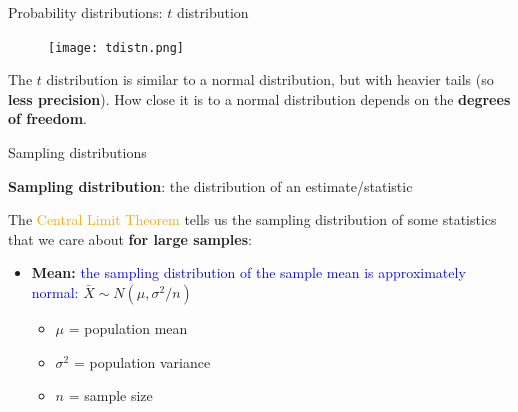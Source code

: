 \documentclass[10pt,t]{beamer}
\begin{document}
\begin{frame}{Probability distributions: $t$ distribution}
\begin{figure}
	\centering \texttt{[image: tdistn.png]}
\end{figure}

The $t$ distribution is similar to a normal distribution, but with heavier tails (so \textbf{less precision}). How close it is to a normal distribution depends on the \textbf{degrees of freedom}.

\end{frame}

\begin{frame}{Sampling distributions}

\textbf{Sampling distribution}: the distribution of an estimate/statistic

\vspace{0.3cm}

The \textcolor{orange}{Central Limit Theorem} tells us the sampling distribution of some statistics that we care about \textbf{for large samples}:
\medskip
\begin{itemize}
		\item \textbf{Mean:} \textcolor{blue}{the sampling distribution of the sample mean is approximately normal:} $\bar{X} \sim N(\mu, \sigma^2 / n)$
	\smallskip
	\begin{itemize}
		\item $\mu$ = population mean
		\smallskip
		\item $\sigma^2$ = population variance
		\smallskip
		\item $n$ = sample size
	\end{itemize}

\end{itemize}
\end{frame}
\end{document}
